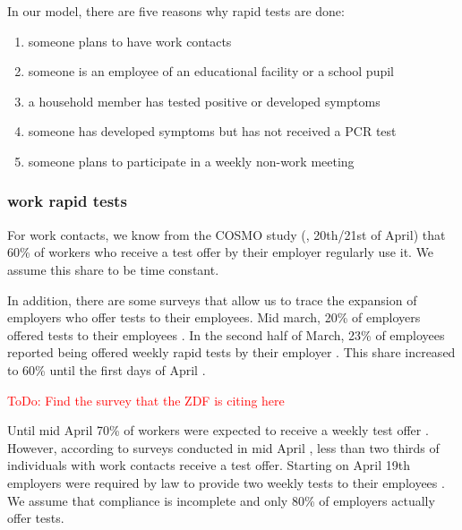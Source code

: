 
In our model, there are five reasons why rapid tests are done:

\begin{enumerate}
    \item someone plans to have work contacts
    \item someone is an employee of an educational facility or a school pupil
    \item a household member has tested positive or developed symptoms
    \item someone has developed symptoms but has not received a PCR test
    \item someone plans to participate in a weekly non-work meeting
\end{enumerate}

\subsubsection{work rapid tests}

For work contacts, we know from the COSMO study (\cite{Betsch2021}, 20th/21st of April)
that 60\% of workers who receive a test offer by their employer regularly use it. We
assume this share to be time constant.

In addition, there are some surveys that allow us to trace the expansion of employers who
offer tests to their employees. Mid march, 20\% of employers offered tests to their
employees \citep{DIHK2021}. In the second half of March, 23\% of employees reported being
offered weekly rapid tests by their employer \citep{Ahlers2021}. This share increased to
60\% until the first days of April \cite{ZDF2021}.

\textcolor{red}{ToDo: Find the survey that the ZDF is citing here}

Until mid April 70\% of workers were expected to receive a
weekly test offer \citep{AerzteZeitung2021}. However, according to surveys conducted in
mid April \citep{Betsch2021}, less than two thirds of individuals with work contacts
receive a test offer. Starting on April 19th employers were required by law to provide
two weekly tests to their employees \citep{Bundesanzeiger2021}. We assume that compliance
is incomplete and only 80\% of employers actually offer tests.

